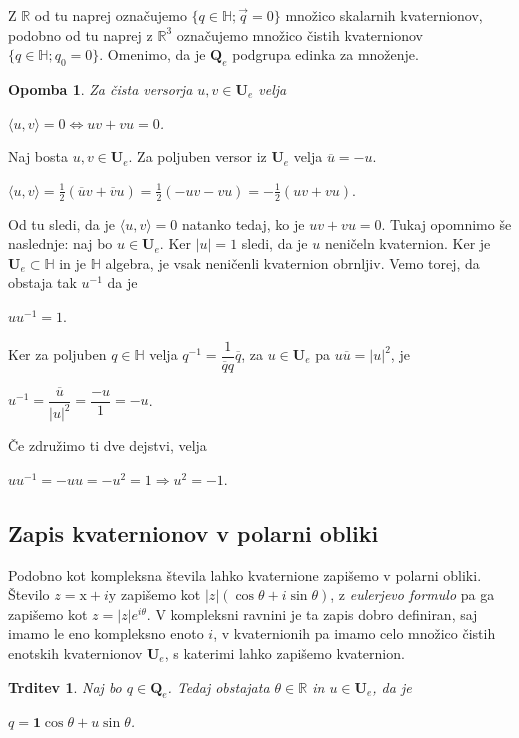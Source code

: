 \documentclass[a4paper,12pt]{article}
\def\R{\mathbb{R}} %
\def\H{\mathbb{H}} %
\def\Qe{\textbf{Q}_{e}} %
\def\Ue{\textbf{U}_{e}} %
\def\1{\textbf{1}}
\newcommand{\dotpr}[2]{\langle #1, #2 \rangle}
\newtheorem{trditev}{Trditev}
\newtheorem{opomba}{Opomba}
\begin{document}
Z $\R$ od tu naprej označujemo $\{ q \in \H; \vec{q} = 0 \}$ množico skalarnih kvaternionov, podobno od tu naprej z $\R^3$ označujemo
množico čistih kvaternionov $\{q \in \H; q_{0} = 0 \}$.
Omenimo, da je $\Qe$ podgrupa edinka za množenje.
\begin{opomba}
   Za čista versorja $u, v \in \Ue$ velja
   \begin{center}
      $\dotpr{u}{v} = 0 \iff uv + vu = 0$.
   \end{center}
\end{opomba}
Naj bosta $u, v \in \Ue$. Za poljuben versor iz $\Ue$ velja $\overline{u} = -u$.
\begin{center}
   $\dotpr{u}{v} = \frac{1}{2}(\overline{u}v + \overline{v}u) = \frac{1}{2}(-uv -vu) = -\frac{1}{2}(uv + vu)$.
\end{center}
Od tu sledi, da je $\dotpr{u}{v} = 0$ natanko tedaj, ko je $uv + vu = 0$.
\newpage
\noindent
Tukaj opomnimo še naslednje: naj bo $u \in \Ue$. Ker $|u| = 1$ sledi, da je $u$ neničeln kvaternion.
Ker je $\Ue \subset \H$ in je $\H$ algebra, je vsak neničenli kvaternion obrnljiv. Vemo torej, da obstaja tak $u^{-1}$ da je
\begin{center}
   $uu^{-1} = 1$.
\end{center}
Ker za poljuben $q \in \H$ velja $q^{-1} = \dfrac{1}{\overline{q}q} \overline{q}$, za $u \in \Ue$ pa $u\overline{u} = |u|^2$, je 
\begin{center}
   $u^{-1} = \dfrac{\overline{u}}{|u|^2} = \dfrac{-u}{1} = -u$.
\end{center}
Če združimo ti dve dejstvi, velja
\begin{center}
   $uu^{-1} = -uu = -u^2 = 1 \Rightarrow u^2 = -1$.
\end{center}

\subsection{Zapis  kvaternionov v polarni obliki}

Podobno kot kompleksna števila lahko kvaternione zapišemo v polarni obliki. Število $z = \text{x} + i\text{y}$ zapišemo kot $|z|( \cos\theta + i\sin\theta )$, z \emph{eulerjevo formulo} pa ga 
zapišemo kot $z = |z|e^{i\theta}$. V kompleksni ravnini je ta zapis dobro definiran, saj imamo le eno kompleksno enoto $i$,
v kvaternionih pa imamo celo množico čistih enotskih kvaternionov $\Ue$, s katerimi lahko zapišemo kvaternion.

\begin{trditev}
Naj bo $q \in \Qe$. Tedaj obstajata $\theta \in \R$ in $u \in \Ue$, da je
\begin{center}
   $q = \1\cos\theta + u\sin\theta$.
\end{center}
\end{trditev}
\end{document}
